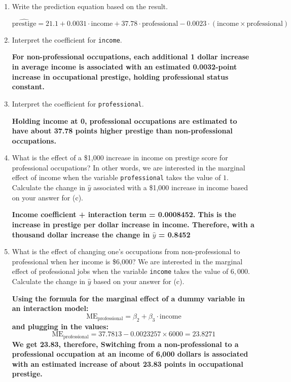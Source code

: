 \documentclass[12pt,letterpaper]{article}
\begin{document}
\begin{enumerate}
	\vspace{0.5cm}
	\item [(c)]
	Write the prediction equation based on the result.
	  
	\textbf{\[
		\widehat{\text{prestige}}
		= 21.1
		+ 0.0031 \cdot \text{income}
		+ 37.78 \cdot \text{professional}
		- 0.0023 \cdot (\text{income} \times \text{professional})
		\]
	}
	
\newpage
	\item [(d)]
	Interpret the coefficient for \texttt{income}.
	
	\textbf{For non-professional occupations, each additional 1 dollar increase in average income is associated with an estimated 0.0032-point increase in occupational prestige, holding professional status constant.}
	
	\vspace{0.5cm}	
	\item [(e)]
	Interpret the coefficient for \texttt{professional}.
	
	\textbf{Holding income at 0, professional occupations are estimated to have about 37.78 points higher prestige than non-professional occupations.}
	
	\newpage
	\item [(f)]
	What is the effect of a \$1,000 increase in income on prestige score for professional occupations? In other words, we are interested in the marginal effect of income when the variable \texttt{professional} takes the value of $1$. Calculate the change in $\hat{y}$ associated with a \$1,000 increase in income based on your answer for (c).
	
	\textbf{Income coefficient + interaction term = 0.0008452. This is the increase in prestige per dollar increase in income. Therefore, with a thousand dollar increase the change in $\hat{y}$ = 0.8452 }
	
	
	\vspace{0.5cm}
	
	
	\item [(g)]
	What is the effect of changing one's occupations from non-professional to professional when her income is \$6,000? We are interested in the marginal effect of professional jobs when the variable \texttt{income} takes the value of $6,000$. Calculate the change in $\hat{y}$ based on your answer for (c).
	
	\textbf{Using the formula for the marginal effect of a dummy variable in an interaction model: \[
		\text{ME}_{\text{professional}}
		= \beta_{2} + \beta_{3} \cdot \text{income}
		\]
	and plugging in the values: 
	\[
	\text{ME}_{\text{professional}}
	= 37.7813 - 0.0023257 \times 6000
	= 23.8271
	\]
	We get 23.83, therefore, Switching from a non-professional to a professional occupation at an income of 6,000 dollars is associated with an estimated increase of about 23.83 points in occupational prestige.}
	
	
\end{enumerate}
\end{document}
